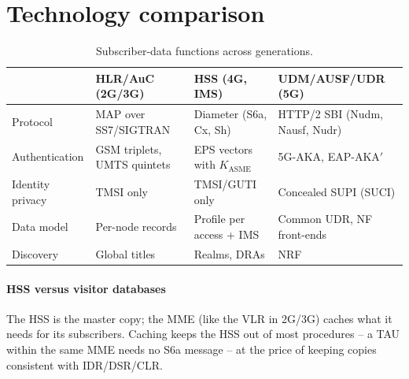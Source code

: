 \documentclass[11pt,a4paper]{article}
\begin{document}
\section{Technology comparison}
\begin{table}[htbp]
\centering\small
\caption{Subscriber-data functions across generations.}\label{tab:cmp}
\begin{tabularx}{\linewidth}{@{}l Y Y Y@{}}
\toprule
{} & HLR/AuC (2G/3G) & HSS (4G, IMS) & UDM/AUSF/UDR (5G) \\
\midrule
Protocol         & MAP over SS7/SIGTRAN & Diameter (S6a, Cx, Sh) & HTTP/2 SBI (Nudm, Nausf, Nudr) \\
Authentication   & GSM triplets, UMTS quintets & EPS vectors with $K_{\mathrm{ASME}}$ & 5G-AKA, EAP-AKA$'$ \\
Identity privacy & TMSI only            & TMSI/GUTI only         & Concealed SUPI (SUCI) \\
Data model       & Per-node records     & Profile per access + IMS & Common UDR, NF front-ends \\
Discovery        & Global titles        & Realms, DRAs           & NRF \\
\bottomrule
\end{tabularx}
\end{table}

\paragraph{HSS versus visitor databases} The HSS is the master copy; the MME (like the VLR in 2G/3G)
caches what it needs for its subscribers. Caching keeps the HSS out of most procedures -- a TAU within the
same MME needs no S6a message -- at the price of keeping copies consistent with IDR/DSR/CLR.

\end{document}
